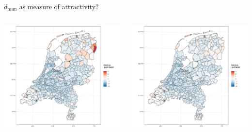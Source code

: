 \documentclass{beamer}
\begin{document}
\begin{frame}{$d_{\text{mun}}$ as measure of attractivity?}
		\begin{columns}
	\begin{column}{0.5\textwidth}
		\begin{center}
			\includegraphics[width=1.1\textwidth]{../fig/p_coef_out}      
		\end{center}
	\end{column}
	\begin{column}{0.5\textwidth} 	
		\begin{center}
			\includegraphics[width=1.1\textwidth]{../fig/p_coef_in}      
		\end{center}
	\end{column}
\end{columns}
\end{frame}
\end{document}
